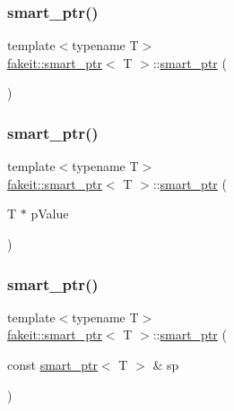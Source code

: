 \subsubsection{\texorpdfstring{smart\_ptr()}{smart\_ptr()}\hspace{0.1cm}{\footnotesize\ttfamily [22/27]}}
{\footnotesize\ttfamily template$<$typename T$>$ \\
\mbox{\hyperlink{classfakeit_1_1smart__ptr}{fakeit\+::smart\+\_\+ptr}}$<$ T $>$\+::\mbox{\hyperlink{classfakeit_1_1smart__ptr}{smart\+\_\+ptr}} (\begin{DoxyParamCaption}{ }\end{DoxyParamCaption})\hspace{0.3cm}{\ttfamily [inline]}}

\mbox{\label{classfakeit_1_1smart__ptr_afa05248e2dceb62a7ecc706700cfd1bf}} 
\subsubsection{\texorpdfstring{smart\_ptr()}{smart\_ptr()}\hspace{0.1cm}{\footnotesize\ttfamily [23/27]}}
{\footnotesize\ttfamily template$<$typename T$>$ \\
\mbox{\hyperlink{classfakeit_1_1smart__ptr}{fakeit\+::smart\+\_\+ptr}}$<$ T $>$\+::\mbox{\hyperlink{classfakeit_1_1smart__ptr}{smart\+\_\+ptr}} (\begin{DoxyParamCaption}\item[{T $\ast$}]{p\+Value }\end{DoxyParamCaption})\hspace{0.3cm}{\ttfamily [inline]}}

\mbox{\label{classfakeit_1_1smart__ptr_a1157d28b4675e32ae90886871fb1b0bd}} 
\subsubsection{\texorpdfstring{smart\_ptr()}{smart\_ptr()}\hspace{0.1cm}{\footnotesize\ttfamily [24/27]}}
{\footnotesize\ttfamily template$<$typename T$>$ \\
\mbox{\hyperlink{classfakeit_1_1smart__ptr}{fakeit\+::smart\+\_\+ptr}}$<$ T $>$\+::\mbox{\hyperlink{classfakeit_1_1smart__ptr}{smart\+\_\+ptr}} (\begin{DoxyParamCaption}\item[{const \mbox{\hyperlink{classfakeit_1_1smart__ptr}{smart\+\_\+ptr}}$<$ T $>$ \&}]{sp }\end{DoxyParamCaption})\hspace{0.3cm}{\ttfamily [inline]}}

